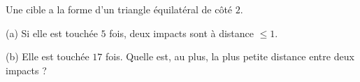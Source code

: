 Une cible a la forme d'un triangle équilatéral de côté $2$.

(a) Si elle est touchée $5$ fois, deux impacts sont à distance $\leq 1$.

(b) Elle est touchée $17$ fois. Quelle est, au plus, la plus petite distance entre deux impacts ?
